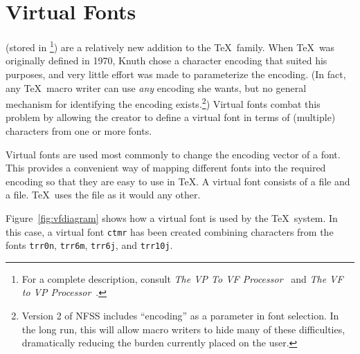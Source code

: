 %
%

\section{Virtual Fonts}
\label{sec:fonts:virtualfonts}

 (stored 
in \footnote{For 
a complete description, consult \textit{The VP To VF
Processor}~\cite{texware:vptovf} and \textit{The VF to VP
Processor}~\cite{texware:vftovp}.}) are a relatively new addition to the \TeX\
family.  When \TeX\ was originally defined in 1970, 
Knuth chose a
character encoding that suited his purposes, and very little effort was made
to parameterize the encoding.  (In fact, any \TeX\ macro writer can use {\em
any\/} encoding she wants, but no general mechanism for identifying the
encoding exists.\footnote{Version 2 of NFSS includes ``encoding'' as a
parameter in font selection.  In the long run, this will allow macro writers
to hide many of these difficulties, dramatically reducing the
burden currently placed on the user.})  Virtual fonts combat this problem by allowing the creator
to define a virtual font in terms of (multiple) characters from one or more
fonts.

\newpage
Virtual fonts are used most commonly to change the encoding
vector of a font.  This provides a convenient way of mapping different
fonts into the required encoding so that they are easy to use in \TeX.
A virtual font consists of a \ext{VF} file and a  file.  \TeX\
uses the \ext{TFM} file as it would any other.

Figure~\ref{fig:vfdiagram} shows how a virtual font is used by the \TeX\
system.  In this case, a virtual font \verb|ctmr| has been created
combining characters from the fonts \verb|trr0n|, \verb|trr6m|, 
\verb|trr6j|, and \verb|trr10j|.

